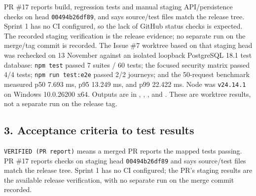 \documentclass[12pt,a4paper]{article}
\begin{document}
PR \#17 reports build, regression tests and manual staging API/persistence checks on head \texttt{00494b26df89}, and says source/test files match the release tree. Sprint 1 has no CI configured, so the lack of GitHub status checks is expected. The recorded staging verification is the release evidence; no separate run on the merge/tag commit is recorded. The Issue \#7 worktree based on that staging head was rechecked on 13 November against an isolated loopback PostgreSQL 18.1 test database: \texttt{npm test} passed 7 suites / 60 tests; the focused security matrix passed 4/4 tests; \texttt{npm run test:e2e} passed 2/2 journeys; and the 50-request benchmark measured p50 7.693 ms, p95 13.249 ms, and p99 22.422 ms. Node was \texttt{v24.14.1} on Windows 10.0.26200 x64. Outputs are in , , , and . These are worktree results, not a separate run on the release tag.

\subsection*{3. Acceptance criteria to test results}
\texttt{VERIFIED (PR report)} means a merged PR reports the mapped tests passing. PR \#17 reports checks on staging head \texttt{00494b26df89} and says source/test files match the release tree. Sprint 1 has no CI configured; the PR's staging results are the available release verification, with no separate run on the merge commit recorded.
\end{document}
